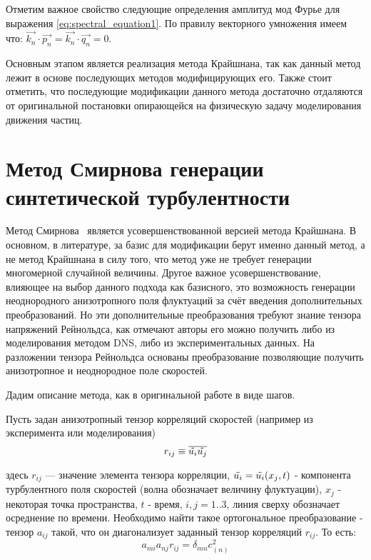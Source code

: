 Отметим важное свойство следующие определения амплитуд мод Фурье для выражения \eqref{eq:spectral_equation1}. По правилу векторного умножения имеем что: $\vec{k_n} \cdot \vec{p_n} = \vec{k_n} \cdot \vec{q_n} = 0$. 

Основным этапом является реализация метода Крайшнана, так как данный метод лежит в основе последующих методов модифицирующих его. Также стоит отметить, что последующие модификации данного метода достаточно отдаляются от оригинальной постановки опирающейся на физическую задачу моделирования движения частиц.

\section{Метод Смирнова генерации синтетической турбулентности} \label{sect2_2}
Метод Смирнова~\cite{Smirnov2001} является усовершенствованной версией метода Крайшнана. 
В основном, в литературе, за базис для модификации берут именно данный метод, а не метод Крайшнана в силу того, что метод уже не требует генерации многомерной случайной величины. 
Другое важное усовершенствование, влияющее на выбор данного подхода как базисного, это возможность генерации неоднородного анизотропного поля флуктуаций за счёт введения дополнительных преобразований. 
Но эти дополнительные преобразования требуют знание тензора напряжений Рейнольдса, как отмечают авторы его можно получить либо из моделирования методом DNS, либо из экспериментальных данных. На разложении тензора Рейнольдса основаны преобразование позволяющие получить анизотропное и неоднородное поле скоростей. 


Дадим описание метода, как в оригинальной работе в виде шагов.

Пусть задан анизотропный тензор корреляций скоростей (например из эксперимента или моделирования)
\begin{equation}
  \label{eq:spectral_equation3}
    r_{ij} \equiv \overline{\Tilde{u_i} \Tilde{u_j}}
\end{equation}

здесь $r_{ij}$ — значение элемента тензора корреляции, $\Tilde{u_i} = \Tilde{u_i}(x_j, t)$ - компонента турбулентного поля скоростей (волна обозначает величину флуктуации), $x_j$ - некоторая точка пространства, $t$ - время, $i,j=1..3$, линия сверху обозначает осреднение по времени. 
Необходимо найти такое ортогональное преобразование - тензор $a_{ij}$ такой, что он диагонализует заданный тензор корреляций $r_{ij}$. То есть:
\begin{equation}
  \label{eq:spectral_equation4}
    a_{mi} a_{nj} r_{ij} = \delta_{mn} c^2_(n)
\end{equation}


